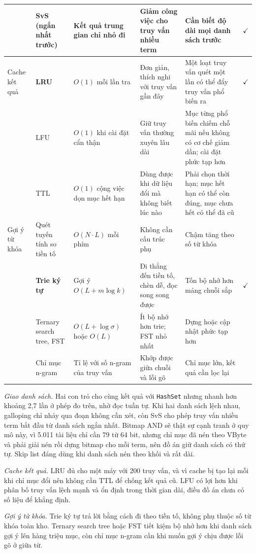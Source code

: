 \documentclass[9pt,twocolumn,a4paper]{extarticle}
\newcommand{\code}[1]{\texttt{#1}}
\begin{document}
\begin{table}[!t]
\begin{tabular}{@{}>{\raggedright\arraybackslash}p{1.9cm}>{\raggedright\arraybackslash}p{3.1cm}>{\raggedright\arraybackslash}p{2.6cm}>{\raggedright\arraybackslash}p{3.9cm}>{\raggedright\arraybackslash}p{4.1cm}c@{}}
& \textbf{SvS} (ngắn nhất trước) & Kết quả trung gian chỉ nhỏ đi & Giảm công việc cho truy vấn nhiều term & Cần biết độ dài mọi danh sách trước & $\checkmark$ \\
\midrule
Cache kết quả
& \textbf{LRU} & $O(1)$ mỗi lần tra & Đơn giản, thích nghi với truy vấn gần đây & Một loạt truy vấn quét một lần có thể đẩy truy vấn phổ biến ra & $\checkmark$ \\
& LFU & $O(1)$ khi cài đặt cẩn thận & Giữ truy vấn thường xuyên lâu dài & Mục từng phổ biến chiếm chỗ mãi nếu không có cơ chế giảm dần; cài đặt phức tạp hơn & \\
& TTL & $O(1)$ cộng việc dọn mục hết hạn & Dùng được khi dữ liệu đổi mà không biết lúc nào & Phải chọn thời hạn; mục hết hạn có thể còn đúng, mục chưa hết có thể đã cũ & \\
\midrule
Gợi ý từ khóa
& Quét tuyến tính so tiền tố & $O(N\cdot L)$ mỗi phím & Không cần cấu trúc phụ & Chậm tăng theo số từ khóa & \\
& \textbf{Trie ký tự} & Gợi ý $O(L+m\log k)$ & Đi thẳng đến tiền tố, chèn dễ, đọc song song được & Tốn bộ nhớ hơn mảng chuỗi sắp & $\checkmark$ \\
& Ternary search tree, FST & $O(L+\log\sigma)$ hoặc $O(L)$ & Ít bộ nhớ hơn trie; FST nhỏ nhất & Dựng hoặc cập nhật phức tạp hơn & \\
& Chỉ mục n-gram & Tỉ lệ với số n-gram của truy vấn & Khớp được giữa chuỗi và lỗi gõ & Chỉ mục lớn, kết quả cần lọc lại & \\
\bottomrule
\end{tabular}
\end{table}

\emph{Giao danh sách.} Hai con trỏ cho cùng kết quả với \code{HashSet} nhưng nhanh hơn khoảng 2,7 lần ở phép đo trên, nhờ đọc tuần tự. Khi hai danh sách lệch nhau, galloping chỉ nhảy qua đoạn không cần xét, còn SvS cho phép truy vấn nhiều term bắt đầu từ danh sách ngắn nhất. Bitmap AND sẽ thật sự cạnh tranh ở quy mô này, vì 5.011 tài liệu chỉ cần 79 từ 64 bit, nhưng chỉ mục đã nén theo VByte và phải giải nén rồi dựng bitmap cho mỗi term, nên đồ án giữ danh sách có thứ tự. Skip list đáng dùng khi danh sách nén theo khối và rất dài.

\emph{Cache kết quả.} LRU đủ cho một máy với 200 truy vấn, và vì cache bị tạo lại mỗi khi chỉ mục đổi nên không cần TTL để chống kết quả cũ. LFU có lợi hơn khi phân bố truy vấn lệch mạnh và ổn định trong thời gian dài, điều đồ án chưa có số liệu để khẳng định.

\emph{Gợi ý từ khóa.} Trie ký tự trả lời bằng cách đi theo tiền tố, không phụ thuộc số từ khóa toàn kho. Ternary search tree hoặc FST tiết kiệm bộ nhớ hơn khi danh sách gợi ý lên hàng triệu mục, còn chỉ mục n-gram cần khi muốn gợi ý chịu được lỗi gõ ở giữa từ.
\end{document}
